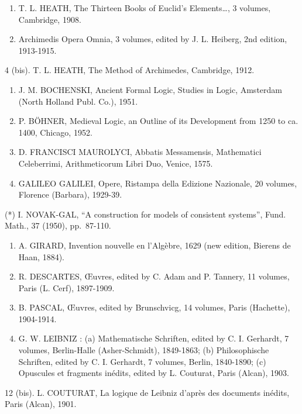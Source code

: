 \begin{enumerate}
\def\labelenumi{\arabic{enumi}.}
\setcounter{enumi}{2}
\item
  T. L. HEATH, The Thirteen Books of Euclid's Elements\ldots, 3 volumes, Cambridge, 1908.
\item
  Archimedis Opera Omnia, 3 volumes, edited by J. L. Heiberg, 2nd edition, 1913-1915.
\end{enumerate}

4 (bis). T. L. HEATH, The Method of Archimedes, Cambridge, 1912.

\begin{enumerate}
\def\labelenumi{\arabic{enumi}.}
\setcounter{enumi}{4}
\item
  J. M. BOCHENSKI, Ancient Formal Logic, Studies in Logic, Amsterdam (North Holland Publ. Co.), 1951.
\item
  P. BÖHNER, Medieval Logic, an Outline of its Development from 1250 to ca. 1400, Chicago, 1952.
\item
  D. FRANCISCI MAUROLYCI, Abbatis Messamensis, Mathematici Celeberrimi, Arithmeticorum Libri Duo, Venice, 1575.
\item
  GALILEO GALILEI, Opere, Ristampa della Edizione Nazionale, 20 volumes, Florence (Barbara), 1929-39.
\end{enumerate}

(*) I. NOVAK-GAL, ``A construction for models of consistent systems'', Fund. Math., 37 (1950), pp.~87-110.

\begin{enumerate}
\def\labelenumi{\arabic{enumi}.}
\setcounter{enumi}{8}
\item
  A. GIRARD, Invention nouvelle en l'Algèbre, 1629 (new edition, Bierens de Haan, 1884).
\item
  R. DESCARTES, Œuvres, edited by C. Adam and P. Tannery, 11 volumes, Paris (L. Cerf), 1897-1909.
\item
  B. PASCAL, Œuvres, edited by Brunschvicg, 14 volumes, Paris (Hachette), 1904-1914.
\item
  G. W. LEIBNIZ : (a) Mathematische Schriften, edited by C. I. Gerhardt, 7 volumes, Berlin-Halle (Asher-Schmidt), 1849-1863; (b) Philosophische Schriften, edited by C. I. Gerhardt, 7 volumes, Berlin, 1840-1890; (c) Opuscules et fragments inédits, edited by L. Couturat, Paris (Alcan), 1903.
\end{enumerate}

12 (bis). L. COUTURAT, La logique de Leibniz d'après des documents inédits, Paris (Alcan), 1901.

